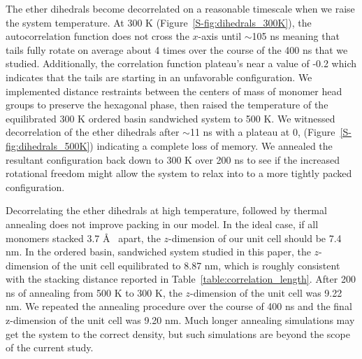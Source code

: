   The ether dihedrals become decorrelated on a reasonable timescale when we raise
  the system temperature. At 300 K (Figure~\ref{S-fig:dihedrals_300K}), the autocorrelation function does
  not cross the $x$-axis until $\sim$105 ns meaning that tails fully rotate on average about 
  4 times over the course of the 400 ns that we studied. Additionally, the correlation 
  function plateau's near a value of -0.2 which indicates that the tails are starting in 
  an unfavorable configuration. We implemented distance restraints between the centers of 
  mass of monomer head groups to preserve the hexagonal phase, then raised the temperature 
  of the equilibrated 300 K ordered basin sandwiched system to 500 K. We witnessed 
  decorrelation of the ether dihedrals after $\sim$11 ns with a plateau at 0, 
  (Figure~\ref{S-fig:dihedrals_500K}) indicating a complete loss of memory. We annealed
  the resultant configuration back down to 300 K over 200 ns to see if the increased rotational
  freedom might allow the system to relax into to a more tightly packed configuration.
  
  Decorrelating the ether dihedrals at high temperature, followed by thermal annealing
  does not improve packing in our model. In the ideal case, if all monomers stacked 
  3.7 \AA~ apart, the $z$-dimension of our unit cell should be 7.4 nm. In the ordered basin, 
  sandwiched system studied in this paper, the $z$-dimension of the unit cell equilibrated 
  to 8.87 nm, which is roughly consistent with the stacking distance reported in 
  Table~\ref{table:correlation_length}. After 200 ns of annealing from 500 K to 300 K, the 
  $z$-dimension of the unit cell was 9.22 nm. We repeated the annealing procedure over the 
  course of 400 ns and the final z-dimension of the unit cell was 9.20 nm. Much longer
  annealing simulations may get the system to the correct density, but such simulations are beyond
  the scope of the current study.

  
